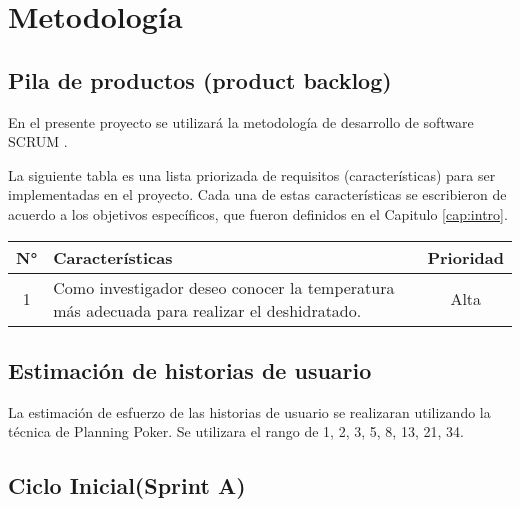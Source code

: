 \chapter{Metodología}

\section{Pila de productos (product backlog)}
En el presente proyecto se utilizará la metodología de desarrollo de software
SCRUM \cite{scrum_book}.

La siguiente tabla es una lista priorizada de requisitos (características) para
ser implementadas en el proyecto. Cada una de estas características se
escribieron de acuerdo a los objetivos específicos, que fueron definidos en el
Capitulo \ref{cap:intro}.

\def\arraystretch{2}
\newcommand{\pbtemp}{Como investigador deseo conocer la temperatura más adecuada para realizar el deshidratado. }


\begin{longtable}{|c|p{12.5cm}|c|} %
\hline
\textbf{N°} & \textbf{Características } & \textbf{Prioridad} \\ \hline
\hline

1 & \pbtemp & Alta  \\ \hline
\end{longtable}

\section{Estimación de historias de usuario}
La estimación de esfuerzo de las historias de usuario se realizaran utilizando
la técnica de Planning Poker. Se utilizara el rango de 1, 2, 3, 5, 8, 13, 21, 34.

\section{Ciclo Inicial(Sprint A) }


